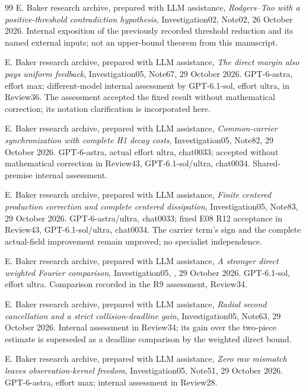 \documentclass[11pt]{article}
\numberwithin{equation}{section}
\begin{document}
\begin{thebibliography}{99}
E. Baker research archive, prepared with LLM assistance,
\emph{Rodgers--Tao with a positive-threshold contradiction hypothesis},
Investigation02, Note02, 26 October 2026. Internal exposition of the
previously recorded threshold reduction and its named external inputs;
not an upper-bound theorem from this manuscript.

E. Baker research archive, prepared with LLM assistance,
\emph{The direct margin also pays uniform feedback},
Investigation05, Note67, 29 October 2026.
GPT-6-astra, effort max; different-model internal assessment by
GPT-6.1-sol, effort ultra, in Review36. The assessment accepted the
fixed result without mathematical correction; its notation clarification
is incorporated here.

E. Baker research archive, prepared with LLM assistance,
\emph{Common-carrier synchronization with complete H1 decay costs},
Investigation05, Note82, 29 October 2026. GPT-6-astra, actual effort ultra,
chat0033; accepted without mathematical correction in Review43,
GPT-6.1-sol/ultra, chat0034. Shared-premise internal assessment.

E. Baker research archive, prepared with LLM assistance,
\emph{Finite centered production correction and complete centered
dissipation}, Investigation05, Note83, 29 October 2026.
GPT-6-astra/ultra, chat0033; fixed E08 R12 acceptance in Review43,
GPT-6.1-sol/ultra, chat0034. The carrier term's sign and the complete
actual-field improvement remain unproved; no specialist independence.

E. Baker research archive, prepared with LLM assistance,
\emph{A stronger direct weighted Fourier comparison},
Investigation05, ,
29 October 2026. GPT-6.1-sol, effort ultra.
Comparison recorded in the R9 assessment, Review34.

E. Baker research archive, prepared with LLM assistance,
\emph{Radial second cancellation and a strict collision-deadline gain},
Investigation05, Note63, 29 October 2026. Internal assessment in
Review34; its gain over the two-piece estimate is superseded as a
deadline comparison by the weighted direct bound.

E. Baker research archive, prepared with LLM assistance,
\emph{Zero raw mismatch leaves observation-kernel freedom},
Investigation05, Note51, 29 October 2026.
GPT-6-astra, effort max; internal assessment in Review28.


\end{thebibliography}
\end{document}
